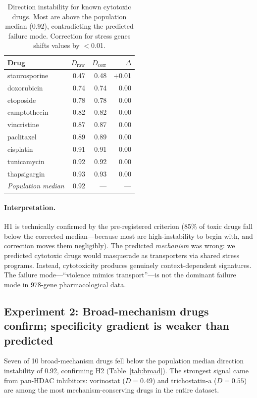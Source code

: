 \documentclass{article}
\begin{document}
\begin{table}[t]
\centering
\caption{Direction instability for known cytotoxic drugs. Most are above the
population median (0.92), contradicting the predicted failure mode.
Correction for stress genes shifts values by $<$0.01.}
\label{tab:toxic}
\small
\begin{tabular}{lrrr}
\toprule
Drug & $D_{\text{raw}}$ & $D_{\text{corr}}$ & $\Delta$ \\
\midrule
staurosporine & 0.47 & 0.48 & $+$0.01 \\
doxorubicin & 0.74 & 0.74 & 0.00 \\
etoposide & 0.78 & 0.78 & 0.00 \\
camptothecin & 0.82 & 0.82 & 0.00 \\
vincristine & 0.87 & 0.87 & 0.00 \\
paclitaxel & 0.89 & 0.89 & 0.00 \\
cisplatin & 0.91 & 0.91 & 0.00 \\
tunicamycin & 0.92 & 0.92 & 0.00 \\
thapsigargin & 0.93 & 0.93 & 0.00 \\
\midrule
\emph{Population median} & 0.92 & --- & --- \\
\bottomrule
\end{tabular}
\end{table}

\paragraph{Interpretation.}
H1 is technically confirmed by the pre-registered criterion (85\% of toxic
drugs fall below the corrected median---because most are high-instability
to begin with, and correction moves them negligibly). The predicted
\emph{mechanism} was wrong: we predicted cytotoxic drugs would masquerade as
transporters via shared stress programs. Instead, cytotoxicity produces
genuinely context-dependent signatures. The failure mode---``violence mimics
transport''---is not the dominant failure mode in 978-gene pharmacological data.

\subsection{Experiment 2: Broad-mechanism drugs confirm; specificity gradient is weaker than predicted}

Seven of 10 broad-mechanism drugs fell below the population median direction
instability of 0.92, confirming H2 (Table~\ref{tab:broad}). The strongest
signal came from pan-HDAC inhibitors: vorinostat ($D = 0.49$) and
trichostatin-a ($D = 0.55$) are among the most mechanism-conserving drugs
in the entire dataset.
\end{document}
